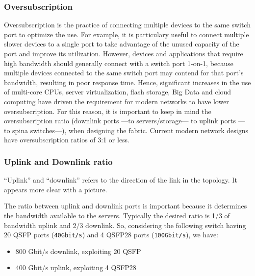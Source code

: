\subsubsection{Oversubscription}
Oversubscription is the practice of connecting multiple devices to the same
switch port to optimize the use. For example, it is particulary useful to connect multiple slower devices to a single port to take advantage of the unused
capacity of the port and improve its utilization. However, devices and applications that require high bandwidth should generally connect with a switch
port 1-on-1, because multiple devices connected to the same switch port may
contend for that port’s bandwidth, resulting in poor response time. Hence,
significant increases in the use of multi-core CPUs, server virtualization, flash
storage, Big Data and cloud computing have driven the requirement for modern networks to have lower oversubscription. For this reason, it is important
to keep in mind the oversubscription ratio (downlink ports ---to servers/storage--- to uplink ports ---to spina switches---), when designing the fabric.
Current modern network designs have oversubscription ratios of 3:1 or less.

\subsubsection{Uplink and Downlink ratio}
``Uplink'' and ``downlink'' refers to the direction of the link in the topology. It appears more clear with a picture.

The ratio between uplink and downlink ports is important because it determines the bandwidth available to the servers. Typically the desired ratio is 1/3 of bandwidth uplink and 2/3 downlink.
So, considering the following switch having 20 QSFP ports (\texttt{40Gbit/s}) and 4 QSFP28 ports (\texttt{100Gbit/s}), we have:
\begin{itemize}
   \item 800 Gbit/s downlink, exploiting 20 QSFP
   \item 400 Gbit/s uplink, exploiting 4 QSFP28
\end{itemize}

